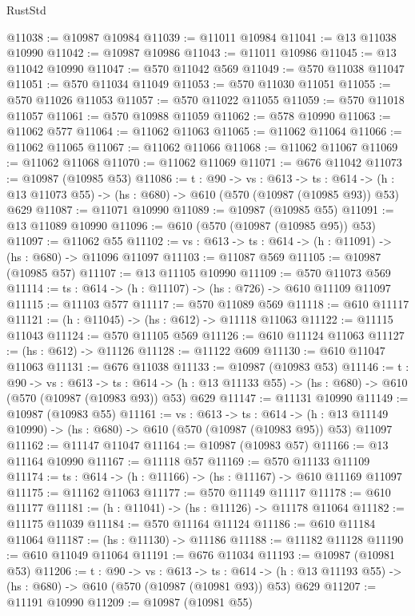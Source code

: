 \begin{lexlean}{RustStd}
\begin{coremodule}
@11038 := @10987 @10984
@11039 := @11011 @10984
@11041 := @13 @11038 @10990
@11042 := @10987 @10986
@11043 := @11011 @10986
@11045 := @13 @11042 @10990
@11047 := @570 @11042 @569
@11049 := @570 @11038 @11047
@11051 := @570 @11034 @11049
@11053 := @570 @11030 @11051
@11055 := @570 @11026 @11053
@11057 := @570 @11022 @11055
@11059 := @570 @11018 @11057
@11061 := @570 @10988 @11059
@11062 := @578 @10990
@11063 := @11062 @577
@11064 := @11062 @11063
@11065 := @11062 @11064
@11066 := @11062 @11065
@11067 := @11062 @11066
@11068 := @11062 @11067
@11069 := @11062 @11068
@11070 := @11062 @11069
@11071 := @676 @11042
@11073 := @10987 (@10985 @53)
@11086 := {t : @90} ->
  {vs : @613} ->
  {ts : @614} -> (h : @13 @11073 @55) -> (hs : @680) -> @610 (@570 (@10987 (@10985 @93)) @53) @629
@11087 := @11071 @10990
@11089 := @10987 (@10985 @55)
@11091 := @13 @11089 @10990
@11096 := @610 (@570 (@10987 (@10985 @95)) @53)
@11097 := @11062 @55
@11102 := {vs : @613} -> {ts : @614} -> (h : @11091) -> (hs : @680) -> @11096 @11097
@11103 := @11087 @569
@11105 := @10987 (@10985 @57)
@11107 := @13 @11105 @10990
@11109 := @570 @11073 @569
@11114 := {ts : @614} -> (h : @11107) -> (hs : @726) -> @610 @11109 @11097
@11115 := @11103 @577
@11117 := @570 @11089 @569
@11118 := @610 @11117
@11121 := (h : @11045) -> (hs : @612) -> @11118 @11063
@11122 := @11115 @11043
@11124 := @570 @11105 @569
@11126 := @610 @11124 @11063
@11127 := (hs : @612) -> @11126
@11128 := @11122 @609
@11130 := @610 @11047 @11063
@11131 := @676 @11038
@11133 := @10987 (@10983 @53)
@11146 := {t : @90} ->
  {vs : @613} ->
  {ts : @614} -> (h : @13 @11133 @55) -> (hs : @680) -> @610 (@570 (@10987 (@10983 @93)) @53) @629
@11147 := @11131 @10990
@11149 := @10987 (@10983 @55)
@11161 := {vs : @613} ->
  {ts : @614} ->
  (h : @13 @11149 @10990) -> (hs : @680) -> @610 (@570 (@10987 (@10983 @95)) @53) @11097
@11162 := @11147 @11047
@11164 := @10987 (@10983 @57)
@11166 := @13 @11164 @10990
@11167 := @11118 @57
@11169 := @570 @11133 @11109
@11174 := {ts : @614} -> (h : @11166) -> (hs : @11167) -> @610 @11169 @11097
@11175 := @11162 @11063
@11177 := @570 @11149 @11117
@11178 := @610 @11177
@11181 := (h : @11041) -> (hs : @11126) -> @11178 @11064
@11182 := @11175 @11039
@11184 := @570 @11164 @11124
@11186 := @610 @11184 @11064
@11187 := (hs : @11130) -> @11186
@11188 := @11182 @11128
@11190 := @610 @11049 @11064
@11191 := @676 @11034
@11193 := @10987 (@10981 @53)
@11206 := {t : @90} ->
  {vs : @613} ->
  {ts : @614} -> (h : @13 @11193 @55) -> (hs : @680) -> @610 (@570 (@10987 (@10981 @93)) @53) @629
@11207 := @11191 @10990
@11209 := @10987 (@10981 @55)

\end{coremodule}
\end{lexlean}
